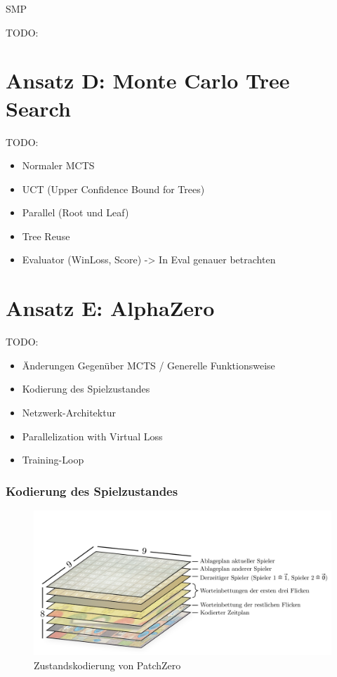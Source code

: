 \ac{SMP}

TODO:

\section{Ansatz D: Monte Carlo Tree Search}
\label{section:erstellung-ansatz-c}

TODO:

\begin{itemize}
    \item Normaler MCTS
    \item UCT (Upper Confidence Bound for Trees)
    \item Parallel (Root und Leaf)
    \item Tree Reuse
    \item Evaluator (WinLoss, Score) -> In Eval genauer betrachten
\end{itemize}

\section{Ansatz E: AlphaZero}
\label{section:erstellung-ansatz-d}

TODO:

\begin{itemize}
    \item Änderungen Gegenüber MCTS / Generelle Funktionsweise
    \item Kodierung des Spielzustandes
    \item Netzwerk-Architektur
    \item Parallelization with Virtual Loss
    \item Training-Loop
\end{itemize}

\subsubsection*{Kodierung des Spielzustandes}

\begin{figure}[!ht]
    \centering
    \vspace*{-1.75cm}
    \includegraphics[width=\textwidth]{res/pictures/patch-zero-state.pdf}
    \caption{Zustandskodierung von PatchZero}
    \label{fig:patch-zero-state}
\end{figure}

